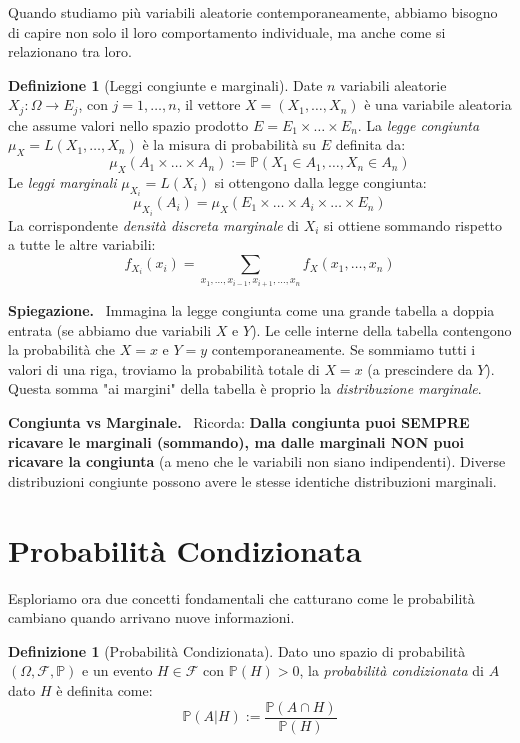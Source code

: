 \documentclass[11pt, a4paper]{report}
\theoremstyle{plain}
\theoremstyle{definition}
\newtheorem{definition}[theorem]{Definizione}
\theoremstyle{remark}
\newenvironment{hint}[1][Hint]
{\begin{mdframed}[backgroundcolor=blue!5, linecolor=blue!50, linewidth=2pt, topline=false, rightline=false, bottomline=false]
\textbf{\textsf{#1.}}\ }
{\end{mdframed}}
\newenvironment{spiegazione}[1][Spiegazione]
{\begin{mdframed}[backgroundcolor=green!5, linecolor=green!50, linewidth=2pt, topline=false, rightline=false, bottomline=false]
\textbf{\textsf{#1.}}\ }
{\end{mdframed}}
\newcommand{\PP}{\mathbb{P}}
\newcommand{\F}{\mathcal{F}}
\newcommand{\1}{\mathbf{1}}
\begin{document}
Quando studiamo più variabili aleatorie contemporaneamente, abbiamo bisogno di capire non solo il loro comportamento individuale, ma anche come si relazionano tra loro.

\begin{definition}[Leggi congiunte e marginali]
Date $n$ variabili aleatorie $X_j : \Omega \to E_j$, con $j=1,\dots,n$, il vettore $X = (X_1, \dots, X_n)$ è una variabile aleatoria che assume valori nello spazio prodotto $E = E_1 \times \dots \times E_n$.
La \emph{legge congiunta} $\mu_X = L(X_1, \dots, X_n)$ è la misura di probabilità su $E$ definita da:
\[ \mu_X(A_1 \times \dots \times A_n) := \PP(X_1 \in A_1, \dots, X_n \in A_n) \]
Le \emph{leggi marginali} $\mu_{X_i} = L(X_i)$ si ottengono dalla legge congiunta:
\[ \mu_{X_i}(A_i) = \mu_X(E_1 \times \dots \times A_i \times \dots \times E_n) \]
La corrispondente \emph{densità discreta marginale} di $X_i$ si ottiene sommando rispetto a tutte le altre variabili:
\[ f_{X_i}(x_i) = \sum_{x_1, \dots, x_{i-1}, x_{i+1}, \dots, x_n} f_X(x_1, \dots, x_n) \]
\end{definition}

\begin{spiegazione}
    Immagina la legge congiunta come una grande tabella a doppia entrata (se abbiamo due variabili $X$ e $Y$). Le celle interne della tabella contengono la probabilità che $X=x$ e $Y=y$ contemporaneamente. 
    Se sommiamo tutti i valori di una riga, troviamo la probabilità totale di $X=x$ (a prescindere da $Y$). Questa somma "ai margini" della tabella è proprio la \emph{distribuzione marginale}.
\end{spiegazione}

\begin{hint}[Congiunta vs Marginale]
    Ricorda: \textbf{Dalla congiunta puoi SEMPRE ricavare le marginali (sommando), ma dalle marginali NON puoi ricavare la congiunta} (a meno che le variabili non siano indipendenti). Diverse distribuzioni congiunte possono avere le stesse identiche distribuzioni marginali.
\end{hint}

\section{Probabilità Condizionata}

Esploriamo ora due concetti fondamentali che catturano come le probabilità cambiano quando arrivano nuove informazioni.

\begin{definition}[Probabilità Condizionata]
Dato uno spazio di probabilità $(\Omega, \F, \PP)$ e un evento $H \in \F$ con $\PP(H) > 0$, la \emph{probabilità condizionata} di $A$ dato $H$ è definita come:
\[ \PP(A|H) := \frac{\PP(A \cap H)}{\PP(H)} \]
\end{definition}
\end{document}
